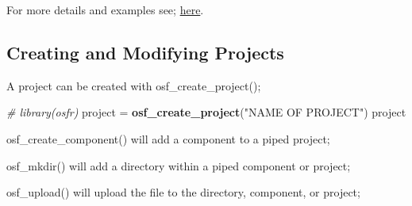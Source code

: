 \documentclass[]{article}
\newenvironment{Shaded}{\begin{snugshade}}{\end{snugshade}}
\newcommand{\KeywordTok}[1]{\textcolor[rgb]{0.13,0.29,0.53}{\textbf{#1}}}
\newcommand{\StringTok}[1]{\textcolor[rgb]{0.31,0.60,0.02}{#1}}
\newcommand{\CommentTok}[1]{\textcolor[rgb]{0.56,0.35,0.01}{\textit{#1}}}
\newcommand{\OperatorTok}[1]{\textcolor[rgb]{0.81,0.36,0.00}{\textbf{#1}}}
\newcommand{\NormalTok}[1]{#1}
\begin{document}
For more details and examples see;
\href{https://centerforopenscience.github.io/osfr/}{\color{blue}here}.

\subsection{Creating and Modifying Projects}

A project can be created with osf\_create\_project();

\begin{Shaded}
\begin{Highlighting}[]
\CommentTok{# library(osfr)}
\NormalTok{project =}\StringTok{ }\KeywordTok{osf_create_project}\NormalTok{(}\StringTok{"NAME OF PROJECT"}\NormalTok{)}
\NormalTok{project}
\end{Highlighting}
\end{Shaded}

osf\_create\_component() will add a component to a piped project;

\begin{Shaded}
\end{Shaded}

osf\_mkdir() will add a directory within a piped component or project;

\begin{Shaded}
\end{Shaded}

osf\_upload() will upload the file to the directory, component, or
project;
\end{document}

